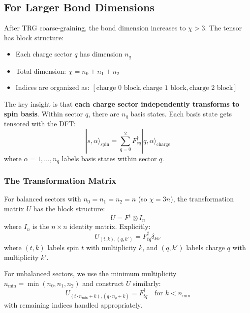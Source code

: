 \documentclass{article}
\begin{document}
\subsection{For Larger Bond Dimensions}

After TRG coarse-graining, the bond dimension increases to $\chi > 3$. The tensor has block structure:
\begin{itemize}
    \item Each charge sector $q$ has dimension $n_q$
    \item Total dimension: $\chi = n_0 + n_1 + n_2$
    \item Indices are organized as: $[\text{charge 0 block}, \text{charge 1 block}, \text{charge 2 block}]$
\end{itemize}

The key insight is that \textbf{each charge sector independently transforms to spin basis}. Within sector $q$, there are $n_q$ basis states. Each basis state gets tensored with the DFT:
\begin{equation}
    |s, \alpha\rangle_{\text{spin}} = \sum_{q=0}^{2} F^\dagger_{sq} |q, \alpha\rangle_{\text{charge}}
\end{equation}
where $\alpha = 1, \ldots, n_q$ labels basis states within sector $q$.

\subsubsection{The Transformation Matrix}

For balanced sectors with $n_0 = n_1 = n_2 = n$ (so $\chi = 3n$), the transformation matrix $U$ has the block structure:
\begin{equation}
    U = F^\dagger \otimes I_n
\end{equation}
where $I_n$ is the $n \times n$ identity matrix. Explicitly:
\begin{equation}
    U_{(t,k),(q,k')} = F^\dagger_{tq} \delta_{kk'}
\end{equation}
where $(t, k)$ labels spin $t$ with multiplicity $k$, and $(q, k')$ labels charge $q$ with multiplicity $k'$.

For unbalanced sectors, we use the minimum multiplicity $n_{\min} = \min(n_0, n_1, n_2)$ and construct $U$ similarly:
\begin{equation}
    U_{(t \cdot n_{\min} + k), (q \cdot n_q + k)} = F^\dagger_{tq} \quad \text{for } k < n_{\min}
\end{equation}
with remaining indices handled appropriately.
\end{document}
